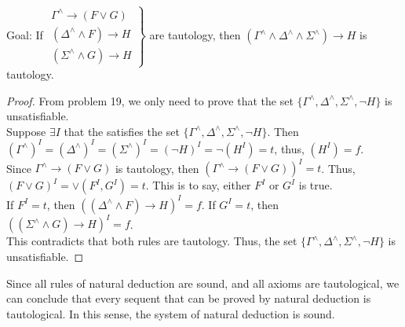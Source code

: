 \begin{enumerate}
\begin{center}
\end{center}
Goal: If $\left.
        \begin{array}{c}      
        \Gamma^{\wedge} \rightarrow (F \vee G) \\
        (\Delta^{\wedge} \wedge F) \rightarrow H \\
        (\Sigma^{\wedge} \wedge G) \rightarrow H
        \end{array}\right\}$
       are tautology, then 
       $(\Gamma^{\wedge} \wedge \Delta^{\wedge} \wedge \Sigma^{\wedge}) \rightarrow H$ 
       is tautology. 
\begin{proof}
From problem 19, we only need to prove that the set $\{\Gamma^{\wedge}, \Delta^{\wedge}, \Sigma^{\wedge}, \neg H \}$ is unsatisfiable. \\
Suppose $\exists I$ that the satisfies the set $\{\Gamma^{\wedge}, \Delta^{\wedge}, \Sigma^{\wedge}, \neg H \}$.
Then $(\Gamma^{\wedge})^I = (\Delta^{\wedge})^I = (\Sigma^{\wedge})^I = (\neg H)^I = \neg (H^I) = t$, thus, $(H^I) = f$. \\
Since $\Gamma^{\wedge} \rightarrow (F \vee G)$ is tautology, then $(\Gamma^{\wedge} \rightarrow (F \vee G))^I = t$. Thus, $(F \vee G)^I = \vee(F^I, G^I) = t$. This is to say, either $F^I$ or $G^I$ is true. \\
If $F^I = t$, then $((\Delta^{\wedge} \wedge F) \rightarrow H)^I = f$. 
If $G^I = t$, then $((\Sigma^{\wedge} \wedge G) \rightarrow H)^I = f$. \\
This contradicts that both rules are tautology. Thus, the set $\{\Gamma^{\wedge}, \Delta^{\wedge}, \Sigma^{\wedge}, \neg H \}$ is unsatisfiable. 
\end{proof}


\end{enumerate}

\newpage

Since all rules of natural deduction are sound, and all axioms are tautological, we can conclude that every sequent that can be proved by natural deduction is tautological. In this sense, the system of natural deduction is sound. 

